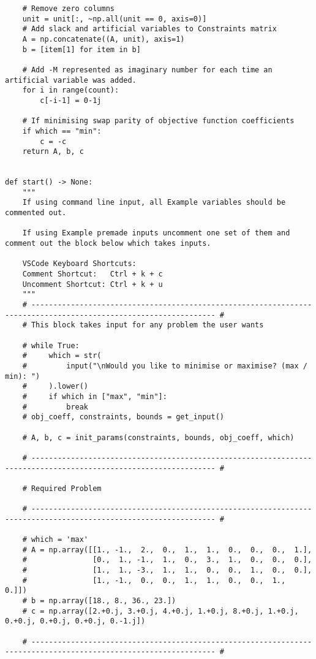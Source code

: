 \documentclass[letterpaper, a4paper]{article}
\begin{document}
\begin{verbatim}
    # Remove zero columns
    unit = unit[:, ~np.all(unit == 0, axis=0)]
    # Add slack and artificial variables to Constraints matrix
    A = np.concatenate((A, unit), axis=1)
    b = [item[1] for item in b]

    # Add -M represented as imaginary number for each time an artificial variable was added.
    for i in range(count):
        c[-i-1] = 0-1j

    # If minimising swap parity of objective function coefficients
    if which == "min":
        c = -c
    return A, b, c


def start() -> None:
    """
    If using command line input, all Example variables should be commented out.

    If using Example premade inputs uncomment one set of them and comment out the block below which takes inputs.

    VSCode Keyboard Shortcuts:
    Comment Shortcut:   Ctrl + k + c
    Uncomment Shortcut: Ctrl + k + u
    """
    # ---------------------------------------------------------------------------------------------------------------- #
    # This block takes input for any problem the user wants

    # while True:
    #     which = str(
    #         input("\nWould you like to minimise or maximise? (max / min): ")
    #     ).lower()
    #     if which in ["max", "min"]:
    #         break
    # obj_coeff, constraints, bounds = get_input()

    # A, b, c = init_params(constraints, bounds, obj_coeff, which)

    # ---------------------------------------------------------------------------------------------------------------- #

    # Required Problem
    
    # ---------------------------------------------------------------------------------------------------------------- #

    # which = 'max'
    # A = np.array([[1., -1.,  2.,  0.,  1.,  1.,  0.,  0.,  0.,  1.],
    #               [0.,  1., -1.,  1.,  0.,  3.,  1.,  0.,  0.,  0.],
    #               [1.,  1., -3.,  1.,  1.,  0.,  0.,  1.,  0.,  0.],
    #               [1., -1.,  0.,  0.,  1.,  1.,  0.,  0.,  1.,  0.]])
    # b = np.array([18., 8., 36., 23.])
    # c = np.array([2.+0.j, 3.+0.j, 4.+0.j, 1.+0.j, 8.+0.j, 1.+0.j, 0.+0.j, 0.+0.j, 0.+0.j, 0.-1.j])

    # ---------------------------------------------------------------------------------------------------------------- #


\end{verbatim}
\end{document}
